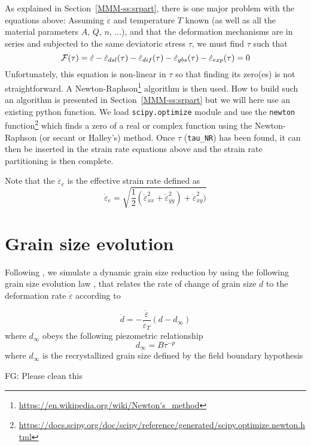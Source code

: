 \documentclass[a4paper]{article}
\begin{document}
As explained in Section~\ref{MMM-ss:srpart}, there is one major problem with the equations above:
Assuming $\dot\varepsilon$ and temperature $T$ known (as well as all the material parameters $A$, $Q$, $n$, ...),
and that the deformation mechanisms are in series and subjected to the same deviatoric stress $\tau$,
we must find $\tau$ such that
\[
{\cal F}(\tau) = \dot\varepsilon -  \dot\varepsilon_{dsl}(\tau) 
-\dot\varepsilon_{dif}(\tau) -\dot\varepsilon_{gbs}(\tau) - \dot\varepsilon_{exp}(\tau) =0
\]
Unfortunately, this equation is non-linear in $\tau$ so that finding its zero(es) is not
straightforward. A Newton-Raphson\footnote{\url{https://en.wikipedia.org/wiki/Newton's_method}}
algorithm is then used. How to build such an algorithm is presented in Section~\ref{MMM-ss:srpart}
but we will here use an existing python function.
We load \lstinline{scipy.optimize} module and use the \lstinline{newton} function\footnote{\url{
https://docs.scipy.org/doc/scipy/reference/generated/scipy.optimize.newton.html}}
which finds a zero of a real or complex function using the Newton-Raphson (or secant or Halley’s) method.
Once $\tau$ (\lstinline{tau_NR}) has been found, it can then be inserted in the strain rate equations above and
the strain rate partitioning is then complete.

Note that the $\dot\varepsilon_e$ is the effective strain rate defined as 
\[
\dot\varepsilon_e = \sqrt{\frac12 (
\dot\varepsilon_{xx}^2+
\dot\varepsilon_{yy}^2)+
\dot\varepsilon_{xy}^2
)} 
\]

\section{Grain size evolution \label{seq:gsev}}

Following \textcite{prgu09}, we simulate a dynamic grain size reduction
by using the following grain size evolution law \textcite{brcp99}, that relates
the rate of change of grain size $\dot{d}$ to the 
deformation rate $\dot{\varepsilon}$ according to

\[
\dot{d} = -\frac{\dot\varepsilon}{\dot\varepsilon_T} (d-d_\infty)
\]
where $d_\infty$ obeys the following piezometric 
relationship
\[
d_\infty = B \tau^{-p}
\]
where $d_\infty$ is the recrystallized grain size defined
by the field boundary hypothesis

FG: Please clean this 



\newpage
\printbibliography
\end{document}

